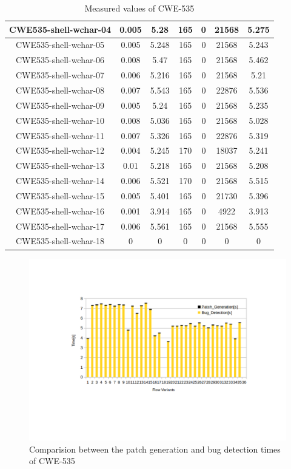 \begin{table}[h!]
\begin{tabular}{||c |c |c |c |c| c|c||}
 \hline
 CWE535-shell-wchar-04 & 0.005 & 5.28 & 165&0& 21568& 5.275\\ 
 \hline
 CWE535-shell-wchar-05 & 0.005 &5.248 & 165&0& 21568& 5.243\\ 
 \hline
 CWE535-shell-wchar-06 & 0.008 & 5.47 & 165&0& 21568&5.462 \\ 
 \hline
 CWE535-shell-wchar-07 & 0.006& 5.216 & 165&0& 21568&5.21 \\ 
 \hline
 CWE535-shell-wchar-08 & 0.007 & 5.543 & 165&0& 22876&5.536 \\ 
 \hline
 CWE535-shell-wchar-09 & 0.005 & 5.24 & 165&0& 21568&5.235 \\ 
 \hline
 CWE535-shell-wchar-10 & 0.008 & 5.036 & 165&0&21568 & 5.028\\ 
 \hline
 CWE535-shell-wchar-11 & 0.007 & 5.326 & 165&0&22876 &5.319 \\ 
 \hline
 CWE535-shell-wchar-12 & 0.004 & 5.245 &170&0& 18037&5.241 \\ 
 \hline
 CWE535-shell-wchar-13 & 0.01 &5.218 & 165&0& 21568&5.208 \\ 
 \hline
 CWE535-shell-wchar-14 & 0.006 & 5.521 &170&0& 21568&5.515 \\ 
 \hline
 CWE535-shell-wchar-15 & 0.005 & 5.401 & 165&0&21730&5.396 \\ 
 \hline
  CWE535-shell-wchar-16 & 0.001 & 3.914 & 165&0& 4922& 3.913\\ 
 \hline
  CWE535-shell-wchar-17 & 0.006 & 5.561 & 165&0& 21568&5.555 \\ 
 \hline
  CWE535-shell-wchar-18 & 0 & 0 & 0&0& 0& 0\\
 \hline
 \hline
\end{tabular}
\caption{Measured values of CWE-535}
\label{table:time3}
\end{table}

\begin{figure}[!htb]
\centering
\includegraphics[trim=5.0cm 0.0cm 0.0cm 0.0cm, scale=0.7]{pdf/time3.pdf}
\vspace{-4.5cm}
\caption{Comparision between the patch generation and bug detection times of CWE-535}
\label{fig:time3}
\end{figure}
